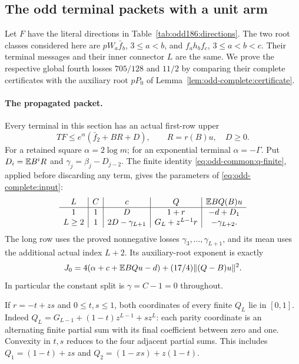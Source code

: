 \subsection{The odd terminal packets with a unit arm}
\label{sec:odd-complete:q-terminals}

Let $F$ have the literal directions in
Table~\ref{tab:odd186:directions}. The two root classes considered here
are $pW_a\bar f_b$, $3\le a<b$, and $f_a h_bf_c$,
$3\le a<b<c$. Their terminal messages and their inner connector $L$
are the same. We prove the respective global fourth losses
$705/128$ and $11/2$ by comparing their complete certificates with
the auxiliary root $pP_0$ of
Lemma~\ref{lem:odd-complete:certificate}.

\paragraph{The propagated packet.}
Every terminal in this section has an actual first-row upper
\begin{equation}\label{eq:odd-q:row}
 TF\le e^\alpha(\bar f_2+BR+D),\qquad
 R=r(B)u,\quad D\ge0.
\end{equation}
For a retained square $\alpha=2\log m$; for an exponential
terminal $\alpha=-\Gamma$. Put $D_i=\mathbb E B^iR$ and
$\gamma_j=\beta_j-D_{j-2}$. The finite identity
\eqref{eq:odd-common:q-finite}, applied before discarding any term,
gives the parameters of \eqref{eq:odd-complete:input}:
\begin{equation}\label{eq:odd-q:parameters}
\begin{array}{c|c|c|c|c}
 L&C&c&Q&\mathbb E BQ(B)u\\\hline
 1&1&D&1+r&-d+D_1\\
 L\ge2&1&2D-\gamma_{L+1}&G_L+z^{L-1}r&-\gamma_{L+2}.
\end{array}
\end{equation}
The long row uses the proved nonnegative losses
$\gamma_3,\ldots,\gamma_{L+1}$, and its mean uses the additional
actual index $L+2$. Its auxiliary-root exponent is exactly
\begin{equation}\label{eq:odd-q:baseline}
 J_0=4(\alpha+c+\mathbb E BQu-d)
               +(17/4)\|(Q-B)u\|^2.
\end{equation}
In particular the constant split is $\gamma=C-1=0$ throughout.

If $r=-t+zs$ and $0\le t,s\le1$, both coordinates of every finite
$Q_L$ lie in $[0,1]$. Indeed
$Q_L=G_{L-1}+(1-t)z^{L-1}+sz^L$: each parity coordinate is an
alternating finite partial sum with its final coefficient between
zero and one. Convexity in $t,s$ reduces to the four adjacent
partial sums. This includes $Q_1=(1-t)+zs$ and
$Q_2=(1-xs)+z(1-t)$.

